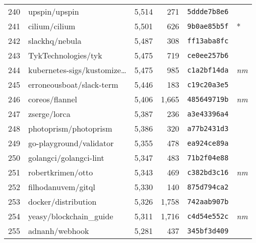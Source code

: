 {\begin{supertabular}{llrrll}
        240 &                      upspin/upspin &  5,514 &    271 &  \texttt{5ddde7b8e6} &              \\
        241 &                      cilium/cilium &  5,501 &    626 &  \texttt{9b0ae85b5f} &            * \\
        242 &                     slackhq/nebula &  5,487 &    308 &  \texttt{ff13aba8fc} &              \\
        243 &                TykTechnologies/tyk &  5,475 &    719 &  \texttt{ce0ee257b6} &              \\
        244 &    kubernetes-sigs/kustomize\ldots &  5,475 &    985 &  \texttt{c1a2bf14da} &  \textit{nm} \\
        245 &           erroneousboat/slack-term &  5,446 &    183 &  \texttt{c19c20a3e5} &              \\
        246 &                     coreos/flannel &  5,406 &  1,665 &  \texttt{485649719b} &  \textit{nm} \\
        247 &                       zserge/lorca &  5,387 &    236 &  \texttt{a3e43396a4} &              \\
        248 &              photoprism/photoprism &  5,386 &    320 &  \texttt{a77b2431d3} &              \\
        249 &            go-playground/validator &  5,355 &    478 &  \texttt{ea924ce89a} &              \\
        250 &             golangci/golangci-lint &  5,347 &    483 &  \texttt{71b2f04e88} &              \\
        251 &                  robertkrimen/otto &  5,343 &    469 &  \texttt{c382bd3c16} &  \textit{nm} \\
        252 &                 filhodanuvem/gitql &  5,330 &    140 &  \texttt{875d794ca2} &              \\
        253 &                docker/distribution &  5,326 &  1,758 &  \texttt{742aab907b} &              \\
        254 &            yeasy/blockchain\_guide &  5,311 &  1,716 &  \texttt{c4d54e552c} &  \textit{nm} \\
        255 &                     adnanh/webhook &  5,281 &    437 &  \texttt{345bf3d409} &              \\

\end{supertabular}}

